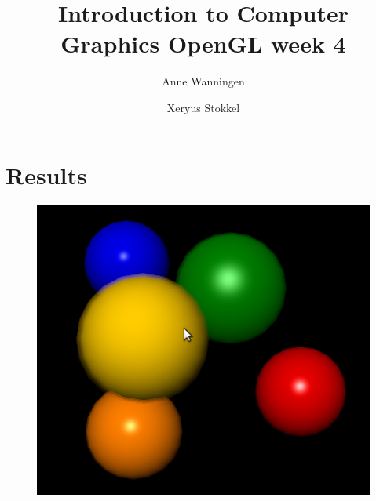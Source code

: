 \documentclass{beamer}
\author{Anne Wanningen \and Xeryus Stokkel}
\title[Week 4]{Introduction to Computer Graphics OpenGL week 4}
\begin{document}
\maketitle

\section{Results}
\begin{frame}
	\begin{figure}
		\includegraphics[height=.90\textheight]{result.png}
	\end{figure}
\end{frame}
\end{document}

